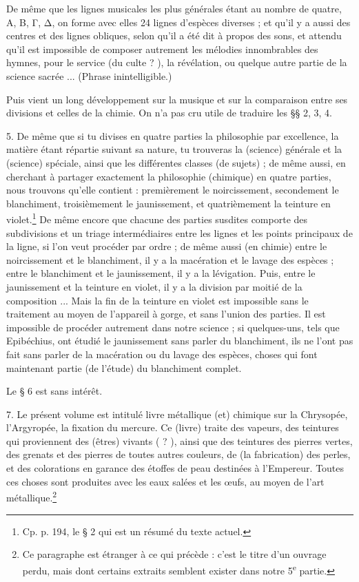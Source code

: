 \documentclass[a4paper, 11pt, oneside, polutonikogreek, french]{article}
\begin{document}
De même que les lignes musicales les plus générales étant au nombre de quatre, Α, Β, Γ, Δ, on forme avec elles 24 lignes d'espèces diverses ; et qu'il y a aussi des centres et des lignes obliques, selon qu'il a été dit à propos des sons, et attendu qu'il est impossible de composer autrement les mélodies innombrables des hymnes, pour le service (du culte ? ), la révélation, ou quelque autre partie de la science sacrée ... (Phrase inintelligible.)

Puis vient un long développement sur la musique et sur la comparaison entre ses divisions et celles de la chimie. On n'a pas cru utile de traduire les §§ 2, 3, 4.

5. De même que si tu divises en quatre parties la philosophie par excellence, la matière étant répartie suivant sa nature, tu trouveras la (science) générale et la (science) spéciale, ainsi que les différentes classes (de sujets) ; de même aussi, en cherchant à partager exactement la philosophie (chimique) en quatre parties, nous trouvons qu'elle contient : premièrement le noircissement, secondement le blanchiment, troisièmement le jaunissement, et quatrièmement la teinture en violet.\footnote{Cp. p. 194, le § 2 qui est un résumé du texte actuel.} De même encore que chacune des parties susdites comporte des subdivisions et un triage intermédiaires entre les lignes et les points principaux de la ligne, si l'on veut procéder par ordre ; de même aussi (en chimie) entre le noircissement et le blanchiment, il y a la macération et le lavage des espèces ; entre le blanchiment et le jaunissement, il y a la lévigation. Puis, entre le jaunissement et la teinture en violet, il y a la division par moitié de la composition ... Mais la fin de la teinture en violet est impossible sans le traitement au moyen de l'appareil à gorge, et sans l'union des parties. Il est impossible de procéder autrement dans notre science ; si quelques-uns, tels que Epibéchius, ont étudié le jaunissement sans parler du blanchiment, ils ne l'ont pas fait sans parler de la macération ou du lavage des espèces, choses qui font maintenant partie (de l'étude) du blanchiment complet.

Le § 6 est sans intérêt.

7. Le présent volume est intitulé livre métallique (et) chimique sur la Chrysopée, l'Argyropée, la fixation du mercure. Ce (livre) traite des vapeurs, des teintures qui proviennent des (êtres) vivants ( ? ), ainsi que des teintures des pierres vertes, des grenats et des pierres de toutes autres couleurs, de (la fabrication) des perles, et des colorations en garance des étoffes de peau destinées à l'Empereur. Toutes ces choses sont produites avec les eaux salées et les œufs, au moyen de l'art métallique.\footnote{Ce paragraphe est étranger à ce qui précède : c'est le titre d'un ouvrage perdu, mais dont certains extraits semblent exister dans notre 5\textsuperscript{e} partie.}
\end{document}
